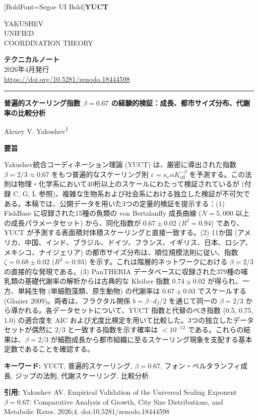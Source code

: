 \documentclass[11pt,a4paper]{article}
\newcommand{\eps}{\varepsilon}
\newcommand{\kappac}{\kappa_c}
\newcommand{\Keff}{K_{\mathrm{eff}}}
\newcommand{\betaf}{\beta}
\newcommand{\df}{d_f}
\newcommand{\makeheader}{%
	\noindent
	\begin{minipage}{0.17\textwidth}
		\raggedright
		{\fontspec{Segoe UI}[BoldFont=Segoe UI Bold]\bfseries\color{skyblue}\fontsize{46}{46}\selectfont YUCT}%
	\end{minipage}%
	\hspace{30pt}
	\begin{minipage}{0.32\textwidth}
		\raggedright
		{\sffamily\fontsize{11}{13}\selectfont YAKUSHEV\\ UNIFIED\\ COORDINATION THEORY}%
	\end{minipage}%
	\hfill
	\begin{minipage}{0.38\textwidth}
		\raggedleft
		{\sffamily\bfseries テクニカルノート}\\
		{\sffamily 2026年4月発行}\\
		{\sffamily\footnotesize \url{https://doi.org/10.5281/zenodo.18444598}}%
	\end{minipage}
	\par\vspace{5pt}
	\noindent\textcolor{gold}{\rule{\textwidth}{1.6pt}}
	\par\vspace{0pt}
}
\begin{document}
	\thispagestyle{firstpage}
	\makeheader
	
	\vspace{0cm}
	{\LARGE\bfseries 普遍的スケーリング指数 \(\beta = 0.67\) の経験的検証：成長、都市サイズ分布、代謝率の比較分析 \par}
	\vspace{0.2cm}
	
	{\large Alexey V. Yakushev\textsuperscript{1}} \\
	\vspace{0.0cm}
	
	{\color{darkblue}\textbf{\LARGE 要旨}} \par
	{\large
		\noindent
		Yakushev統合コーディネーション理論 (YUCT) は、厳密に導出された指数 \(\betaf = 2/3 \approx 0.67\) をもつ普遍的なスケーリング則 \(\eps = \kappac \alpha \Keff^{-\betaf}\) を予測する。この法則は物理・化学系において40桁以上のスケールにわたって検証されているが (付録 C, G, L 参照)、複雑な生物系および社会系における独立した検証が不可欠である。本稿では、公開データを用いた3つの定量的検証を提示する：(1) FishBase に収録された15種の魚類の von Bertalanffy 成長曲線 (\(N = 5,\!000\) 以上の成長パラメータセット) から、同化指数が \(0.67 \pm 0.02\) (\(R^2=0.94\)) であり、YUCT が予測する表面積対体積スケーリングと直接一致する。(2) 11か国 (アメリカ、中国、インド、ブラジル、ドイツ、フランス、イギリス、日本、ロシア、メキシコ、ナイジェリア) の都市サイズ分布は、順位規模法則に従い、指数 \(\zeta = 0.68 \pm 0.02\) (\(R^2=0.93\)) を示す。これは階層的ネットワークにおける \(\beta = 2/3\) の直接的な発現である。(3) PanTHERIA データベースに収録された379種の哺乳類の基礎代謝率の解析からは古典的な Kleiber 指数 \(0.74 \pm 0.02\) が得られ、一方、単純生物 (単細胞藻類、原生動物) の代謝率は \(0.67 \pm 0.03\) でスケールする (Glazier 2009)。両者は、フラクタル関係 \(b = \betaf \cdot \df/2\) を通じて同一の \(\betaf = 2/3\) から導かれる。各データセットについて、YUCT 指数と代替のべき指数 (0.5, 0.75, 1.0) の適合度を AIC および尤度比検定を用いて比較した。3つの独立したデータセットが偶然に \(2/3\) と一致する指数を示す確率は \(< 10^{-12}\) である。これらの結果は、\(\betaf = 2/3\) が細胞成長から都市組織に至るスケーリング現象を支配する基本定数であることを確認する。}
	
	\vspace{0.1cm}
	\noindent
	{\color{darkblue}\textbf{キーワード:}} YUCT, 普遍的スケーリング, \(\beta = 0.67\), フォン・ベルタランフィ成長, ジップの法則, 代謝スケーリング, 比較分析.
	
	\vspace{0.1cm}
	\noindent
	{\color{darkblue}\textbf{引用:}} Yakushev AV. Empirical Validation of the Universal Scaling Exponent \(\beta = 0.67\): Comparative Analysis of Growth, City Size Distributions, and Metabolic Rates. 2026;4. doi:10.5281/zenodo.18444598
	
\end{document}
